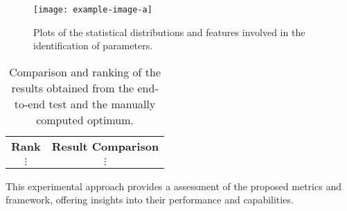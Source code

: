 \begin{figure}[ht]
  \centering
  \texttt{[image: example-image-a]}
  \caption{Plots of the statistical distributions and features involved in the identification of parameters.}
  \label{fig:distributions}
\end{figure}

\begin{table}[ht]
  \centering
  \caption{Comparison and ranking of the results obtained from the end-to-end test and the manually computed optimum.}
  \label{tab:results}
  \begin{tabular}{c|c}
    \textbf{Rank} & \textbf{Result Comparison} \\

    $\vdots$      & $\vdots$                   \\
  \end{tabular}
\end{table}

This experimental approach provides a assessment of the proposed metrics and framework, offering insights into their performance and capabilities.